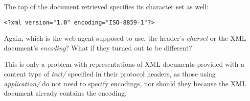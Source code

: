 The top of the document retrieved specifies its character set as well:
{\small
\begin{Verbatim}[commandchars=\\\{\}]
    <?xml version="1.0" encoding="ISO-8859-1"?>
\end{Verbatim}
}

Again, which is the web agent supposed to use, the header's \emph{charset} or the XML document's \emph{encoding}?  What if they turned out to be different?

This is only a problem with representations of XML documents provided with a content type of \emph{text/} specified in their protocol headers, as those using \emph{application/} do not need to specify encodings, nor should they because the XML document already contains the encoding.